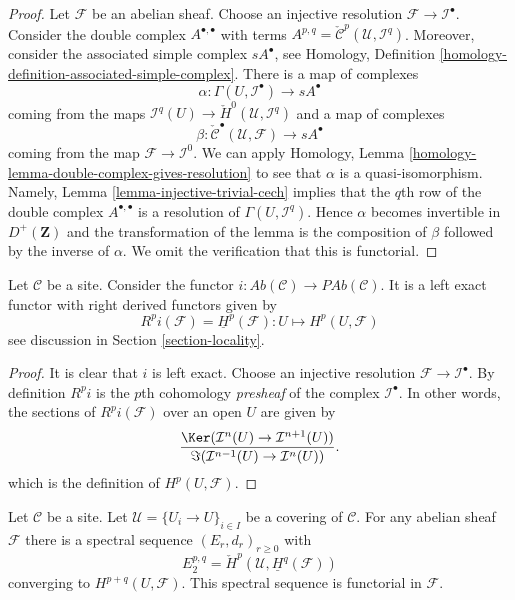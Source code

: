 \begin{proof}
Let $\mathcal{F}$ be an abelian sheaf. Choose an injective resolution
$\mathcal{F} \to \mathcal{I}^\bullet$. Consider the double complex
$A^{\bullet, \bullet}$ with terms
$A^{p, q} = \check{\mathcal{C}}^p(\mathcal{U}, \mathcal{I}^q)$.
Moreover, consider the associated simple complex
$sA^\bullet$, see
Homology, Definition \ref{homology-definition-associated-simple-complex}.
There is a map of complexes
$$
\alpha :
\Gamma(U, \mathcal{I}^\bullet)
\longrightarrow
sA^\bullet
$$
coming from the maps
$\mathcal{I}^q(U) \to \check{H}^0(\mathcal{U}, \mathcal{I}^q)$
and a map of complexes
$$
\beta :
\check{\mathcal{C}}^\bullet(\mathcal{U}, \mathcal{F})
\longrightarrow
sA^\bullet
$$
coming from the map $\mathcal{F} \to \mathcal{I}^0$.
We can apply
Homology, Lemma \ref{homology-lemma-double-complex-gives-resolution}
to see that $\alpha$ is a quasi-isomorphism.
Namely, Lemma \ref{lemma-injective-trivial-cech} implies that
the $q$th row of the double complex $A^{\bullet, \bullet}$ is a
resolution of $\Gamma(U, \mathcal{I}^q)$.
Hence $\alpha$ becomes invertible in $D^{+}(\mathbf{Z})$ and
the transformation of the lemma is the composition of $\beta$
followed by the inverse of $\alpha$. We omit the verification
that this is functorial.
\end{proof}

\begin{lemma}
\label{lemma-include}
Let $\mathcal{C}$ be a site.
Consider the functor
$i : \textit{Ab}(\mathcal{C}) \to \textit{PAb}(\mathcal{C})$.
It is a left exact functor with right derived functors given by
$$
R^pi(\mathcal{F}) = \underline{H}^p(\mathcal{F}) :
U \longmapsto H^p(U, \mathcal{F})
$$
see discussion in Section \ref{section-locality}.
\end{lemma}

\begin{proof}
It is clear that $i$ is left exact.
Choose an injective resolution $\mathcal{F} \to \mathcal{I}^\bullet$.
By definition $R^pi$ is the $p$th cohomology {\it presheaf}
of the complex $\mathcal{I}^\bullet$. In other words, the
sections of $R^pi(\mathcal{F})$ over an open $U$ are given by
$$
\frac{\Ker(\mathcal{I}^n(U) \to \mathcal{I}^{n + 1}(U))}
{\Im(\mathcal{I}^{n - 1}(U) \to \mathcal{I}^n(U))}.
$$
which is the definition of $H^p(U, \mathcal{F})$.
\end{proof}

\begin{lemma}
\label{lemma-cech-spectral-sequence}
Let $\mathcal{C}$ be a site. Let $\mathcal{U} = \{U_i \to U\}_{i \in I}$
be a covering of $\mathcal{C}$. For any abelian sheaf $\mathcal{F}$ there
is a spectral sequence $(E_r, d_r)_{r \geq 0}$ with
$$
E_2^{p, q} = \check{H}^p(\mathcal{U}, \underline{H}^q(\mathcal{F}))
$$
converging to $H^{p + q}(U, \mathcal{F})$.
This spectral sequence is functorial in $\mathcal{F}$.
\end{lemma}

